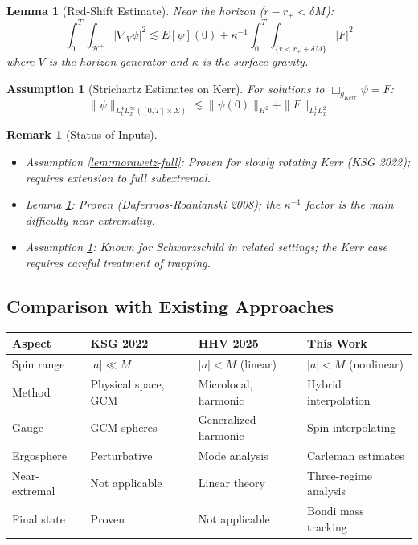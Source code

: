 \documentclass[12pt,a4paper]{article}
\newtheorem{lemma}[theorem]{Lemma}
\newtheorem{remark}[theorem]{Remark}
\newtheorem{assumption}[theorem]{Assumption}
\begin{document}
\begin{lemma}[Red-Shift Estimate]\label{lem:redshift}
Near the horizon ($r - r_+ < \delta M$):
\begin{equation}
\int_0^T \int_{\mathcal{H}^+} |\nabla_V \psi|^2 \lesssim E[\psi](0) + \kappa^{-1} \int_0^T \int_{\{r < r_+ + \delta M\}} |F|^2
\end{equation}
where $V$ is the horizon generator and $\kappa$ is the surface gravity.
\end{lemma}

\begin{assumption}[Strichartz Estimates on Kerr]\label{lem:strichartz-kerr}
For solutions to $\Box_{g_{Kerr}} \psi = F$:
\begin{equation}
\|\psi\|_{L^4_t L^\infty_x([0,T] \times \Sigma)} \lesssim \|\psi(0)\|_{H^2} + \|F\|_{L^1_t L^2_x}
\end{equation}
\end{assumption}

\begin{remark}[Status of Inputs]
\begin{itemize}
    \item Assumption \ref{lem:morawetz-full}: Proven for slowly rotating Kerr (KSG 2022); requires extension to full subextremal.
    \item Lemma \ref{lem:redshift}: Proven (Dafermos-Rodnianski 2008); the $\kappa^{-1}$ factor is the main difficulty near extremality.
    \item Assumption \ref{lem:strichartz-kerr}: Known for Schwarzschild in related settings; the Kerr case requires careful treatment of trapping.
\end{itemize}
\end{remark}

\subsection{Comparison with Existing Approaches}

\begin{center}
\renewcommand{\arraystretch}{1.3}
\begin{tabular}{@{}p{}p{}p{}p{}@{}}
\toprule
\textbf{Aspect} & \textbf{KSG 2022} & \textbf{HHV 2025} & \textbf{This Work} \\
\midrule
Spin range & $|a| \ll M$ & $|a| < M$ (linear) & $|a| < M$ (nonlinear) \\
Method & Physical space, GCM & Microlocal, harmonic & Hybrid interpolation \\
Gauge & GCM spheres & Generalized harmonic & Spin-interpolating \\
Ergosphere & Perturbative & Mode analysis & Carleman estimates \\
Near-extremal & Not applicable & Linear theory & Three-regime analysis \\
Final state & Proven & Not applicable & Bondi mass tracking \\
\bottomrule
\end{tabular}
\end{center}
\end{document}
